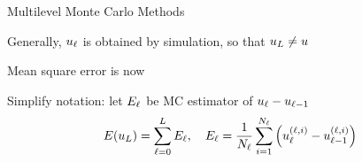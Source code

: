 \begin{frame}{Multilevel Monte Carlo Methods}
    \begin{overlayarea}{\textwidth}{\frameheight}
        \vspace{2em}%
        \begin{squarelist}
            \item<1-> Generally, $u_\ell$ is obtained by simulation, so that $u_L \neq u$
            \item<2-> Mean square error is now
            \item<7-> Simplify notation: let $E_\ell$ be MC estimator of $u_\ell - u_{\ell-1}$
                \begin{equation*}
                    E(u_L) = \sum_{\ell = 0}^L E_\ell, \quad E_\ell = \frac{1}{N_\ell}\sum_{i=1}^{N_\ell}\left(u_\ell^{(\ell,i)} - u_{\ell-1}^{(\ell,i)}\right)
                \end{equation*}
        \end{squarelist}
    \end{overlayarea}
\end{frame}

